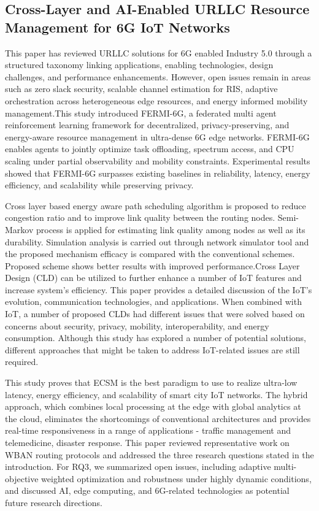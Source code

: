 \documentclass[a4paper,fleqn]{cas-dc}
\numberwithin{equation}{section}
\begin{document}
\subsection{Cross-Layer and AI-Enabled URLLC Resource Management for 6G IoT Networks}
This paper\cite{ibrahim2025urllc} has reviewed URLLC solutions for 6G enabled Industry 5.0 through a structured taxonomy linking applications, enabling technologies, design challenges, and performance enhancements. However, open issues remain in areas such as zero slack security, scalable channel estimation for RIS, adaptive orchestration across heterogeneous edge resources, and energy informed mobility management.This study introduced \cite{andong2025federated} FERMI-6G, a federated multi agent reinforcement learning framework for decentralized, privacy-preserving, and energy-aware resource management in ultra-dense 6G edge networks. FERMI-6G enables agents to jointly optimize task offloading, spectrum access, and CPU scaling under partial observability and mobility constraints. Experimental results showed that FERMI-6G surpasses existing baselines in reliability, latency, energy efficiency, and scalability while preserving privacy.

Cross layer based energy aware path scheduling algorithm\cite{jenila2023cross} is proposed to reduce congestion ratio and to improve link quality between the routing nodes. Semi-Markov process is applied for estimating link quality among nodes as well as its durability. Simulation analysis is carried out through network simulator tool and the proposed mechanism efficacy is compared with the conventional schemes. Proposed scheme shows better results with improved performance.Cross Layer Design (CLD) \cite{ghushe2023cross}can be utilized to further enhance a number of IoT features and increase system’s efficiency. This paper provides a detailed discussion of the IoT’s evolution, communication technologies, and applications. When combined with IoT, a number of proposed CLDs had different issues that were solved based on concerns about security, privacy, mobility, interoperability, and energy consumption. Although this study has explored a number of potential solutions, different approaches that might be taken to address IoT-related issues are still required.

This study proves \cite{zhang2025edge} that ECSM is the best paradigm to use to realize ultra-low latency, energy efficiency, and scalability of smart city IoT networks. The hybrid approach, which combines local processing at the edge with global analytics at the cloud, eliminates the shortcomings of conventional architectures and provides real-time responsiveness in a range of applications - traffic management and telemedicine, disaster response. This paper \cite{qin2025routing} reviewed representative work on WBAN routing protocols and addressed the three research questions stated in the introduction. For RQ3, we summarized open issues, including adaptive multi-objective weighted optimization and robustness under highly dynamic conditions, and discussed AI, edge computing, and 6G-related technologies as potential future research directions. 
\end{document}
